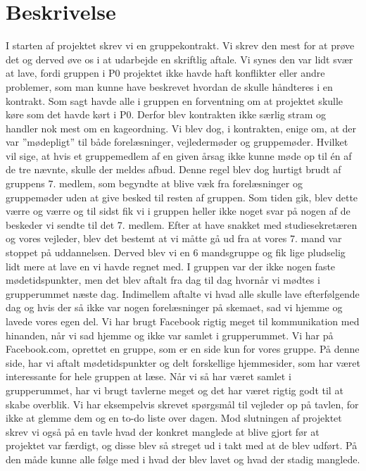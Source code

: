 \section{Beskrivelse}
I starten af projektet skrev vi en gruppekontrakt. Vi skrev den mest for at prøve det og derved øve os i at udarbejde en skriftlig aftale. Vi synes den var lidt svær at lave, fordi gruppen i P0 projektet ikke havde haft konflikter eller andre problemer, som man kunne have beskrevet hvordan de skulle håndteres i en kontrakt. Som sagt havde alle i gruppen en forventning om at projektet skulle køre som det havde kørt i P0. Derfor blev kontrakten ikke særlig stram og handler nok mest om en kageordning. Vi blev dog, i kontrakten, enige om, at der var ”mødepligt” til både forelæsninger, vejledermøder og gruppemøder. Hvilket vil sige, at hvis et gruppemedlem af en given årsag ikke kunne møde op til én af de tre nævnte, skulle der meldes afbud. Denne regel blev dog hurtigt brudt af gruppens 7. medlem, som begyndte at blive væk fra forelæsninger og gruppemøder uden at give besked til resten af gruppen. Som tiden gik, blev dette værre og værre og til sidst fik vi i gruppen heller ikke noget svar på nogen af de beskeder vi sendte til det 7. medlem. Efter at have snakket med studiesekretæren og vores vejleder, blev det bestemt at vi måtte gå ud fra at vores 7. mand var stoppet på uddannelsen. Derved blev vi en 6 mandsgruppe og fik lige pludselig lidt mere at lave en vi havde regnet med.
I gruppen var der ikke nogen faste mødetidspunkter, men det blev aftalt fra dag til dag hvornår vi mødtes i grupperummet næste dag. Indimellem aftalte vi hvad alle skulle lave efterfølgende dag og hvis der så ikke var nogen forelæsninger på skemaet, sad vi hjemme og lavede vores egen del. 
Vi har brugt Facebook rigtig meget til kommunikation med hinanden, når vi sad hjemme og ikke var samlet i grupperummet. Vi har på Facebook.com, oprettet en gruppe, som er en side kun for vores gruppe. På denne side, har vi aftalt mødetidspunkter og delt forskellige hjemmesider, som har været interessante for hele gruppen at læse. Når vi så har været samlet i grupperummet, har vi brugt tavlerne meget og det har været rigtig godt til at skabe overblik. Vi har eksempelvis skrevet spørgsmål til vejleder op på tavlen, for ikke at glemme dem og en to-do liste over dagen. Mod slutningen af projektet skrev vi også på en tavle hvad der konkret manglede at blive gjort før at projektet var færdigt, og disse blev så streget ud i takt med at de blev udført. På den måde kunne alle følge med i hvad der blev lavet og hvad der stadig manglede. 

